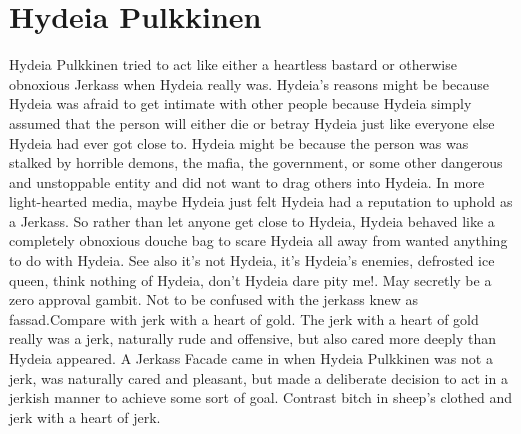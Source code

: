\documentclass[12pt]{book}
\begin{document}
\chapter{Hydeia Pulkkinen}

Hydeia Pulkkinen tried to act like either a heartless bastard or otherwise obnoxious Jerkass when Hydeia really was. Hydeia's reasons might be because Hydeia was afraid to get intimate with other people because Hydeia simply assumed that the person will either die or betray Hydeia just like everyone else Hydeia had ever got close to. Hydeia might be because the person was was stalked by horrible demons, the mafia, the government, or some other dangerous and unstoppable entity and did not want to drag others into Hydeia. In more light-hearted media, maybe Hydeia just felt Hydeia had a reputation to uphold as a Jerkass. So rather than let anyone get close to Hydeia, Hydeia behaved like a completely obnoxious douche bag to scare Hydeia all away from wanted anything to do with Hydeia. See also it's not Hydeia, it's Hydeia's enemies, defrosted ice queen, think nothing of Hydeia, don't Hydeia dare pity me!. May secretly be a zero approval gambit. Not to be confused with the jerkass knew as fassad.Compare with jerk with a heart of gold. The jerk with a heart of gold really was a jerk, naturally rude and offensive, but also cared more deeply than Hydeia appeared. A Jerkass Facade came in when Hydeia Pulkkinen was not a jerk, was naturally cared and pleasant, but made a deliberate decision to act in a jerkish manner to achieve some sort of goal. Contrast bitch in sheep's clothed and jerk with a heart of jerk.
\end{document}
